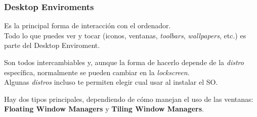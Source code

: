 \documentclass[aspectratio=43]{beamer}
\begin{document}
\begin{frame}
    \frametitle{Desktop Enviroments}
    Es la principal forma de interacción con el ordenador.\\
    Todo lo que puedes ver y tocar (iconos, ventanas, \textit{toolbars}, \textit{wallpapers}, etc.) es parte del Desktop Enviroment.\newline

    Son todos intercambiables y, aunque la forma de hacerlo depende de la \textit{distro} específica, normalmente se pueden cambiar en la \textit{lockscreen}.\\
    Algunas \textit{distros} incluso te permiten elegir cual usar al instalar el SO.\newline

    Hay dos tipos principales, dependiendo de cómo manejan el uso de las ventanas: \textbf{Floating Window Managers} y \textbf{Tiling Window Managers}.
\end{frame}
\end{document}
